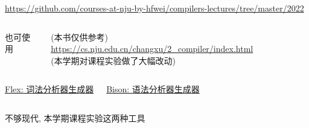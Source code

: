 \begin{frame}{}
  \begin{center}

    \vspace{0.50cm}
    \url{https://github.com/courses-at-nju-by-hfwei/compilers-lectures/tree/master/2022}
  \end{center}
\end{frame}

\begin{frame}{}
  \begin{columns}
    \begin{center}
      也可使用
    \end{center}
    \begin{center}
      (本书仅供参考)
      \url{https://cs.nju.edu.cn/changxu/2_compiler/index.html} \\[3pt]
      (本学期对课程实验做了大幅改动)
    \end{center}
  \end{columns}
\end{frame}

\begin{frame}{}
  \begin{columns}
    \begin{center}
      \href{https://en.wikipedia.org/wiki/Flex_(lexical_analyser_generator)}{Flex: 词法分析器生成器}
    \end{center}
    \begin{center}
      \href{https://en.wikipedia.org/wiki/GNU_Bison}{Bison: 语法分析器生成器}
    \end{center}
  \end{columns}

  \vspace{0.50cm}
  \begin{center}
    不够现代, 本学期课程实验这两种工具
  \end{center}
\end{frame}

